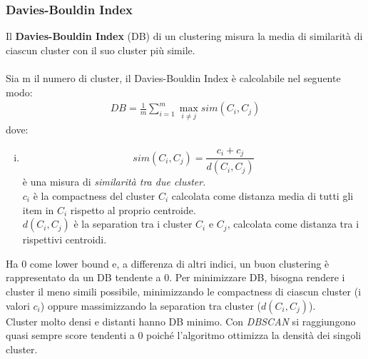\subsubsection{Davies-Bouldin Index}
Il \textbf{Davies-Bouldin Index} (DB) di un clustering misura la media di similarità di ciascun cluster con il suo cluster più simile.\\
\\
Sia m il numero di cluster, il Davies-Bouldin Index è calcolabile nel seguente modo:
\begin{align}
DB = \frac{1}{m}\sum_{i=1}^{m}\max_{i \ne j}sim(C_i, C_j)
\end{align}
dove:
\begin{enumerate}[(i)]
	\item $$ sim(C_i, C_j) =  \frac{c_i + c_j}{d(C_i, C_j)}$$ è una misura di \textit{similarità tra due cluster}.\\
	$c_i$ è la compactness del cluster $C_i$ calcolata come distanza media di tutti gli item in $C_i$ rispetto al proprio centroide.\\
	$d(C_i, C_j)$ è la separation tra i cluster $C_i$ e $C_j$, calcolata come distanza tra i rispettivi centroidi.
\end{enumerate}
Ha 0 come lower bound e, a differenza di altri indici, un buon clustering è rappresentato da un DB tendente a 0. Per minimizzare DB, bisogna rendere i cluster il meno simili possibile, minimizzando le compactness di ciascun cluster (i valori $c_i$) oppure massimizzando la separation tra cluster ($d(C_i, C_j)$).\\
Cluster molto densi e distanti hanno DB minimo. Con \textit{DBSCAN} si raggiungono quasi sempre score tendenti a 0 poiché l'algoritmo ottimizza la densità dei singoli cluster.

